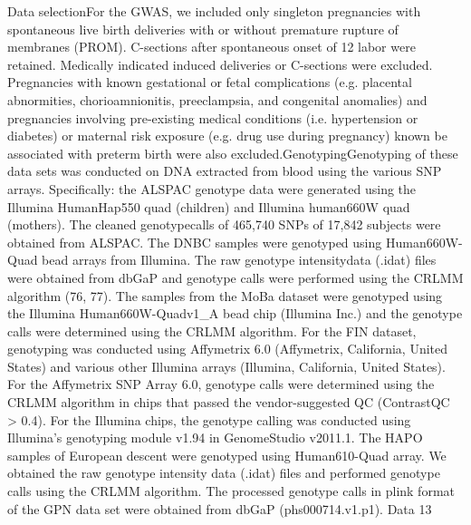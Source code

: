 Data selectionFor the GWAS, we included only singleton pregnancies with spontaneous live birth deliveries with or without premature rupture of membranes (PROM). C-sections after spontaneous onset of 12 labor were retained. Medically indicated induced deliveries or C-sections were excluded. Pregnancies with known gestational or fetal complications (e.g. placental abnormities, chorioamnionitis, preeclampsia, and congenital anomalies) and pregnancies involving pre-existing medical conditions (i.e. hypertension or diabetes) or maternal risk exposure (e.g. drug use during pregnancy) known be associated with preterm birth were also excluded.GenotypingGenotyping of these data sets was conducted on DNA extracted from blood using the various SNP arrays. Specifically: the ALSPAC genotype data were generated using the Illumina HumanHap550 quad (children) and Illumina human660W quad (mothers). The cleaned genotypecalls of 465,740 SNPs of 17,842 subjects were obtained from ALSPAC. The DNBC samples were genotyped using Human660W-Quad bead arrays from Illumina. The raw genotype intensitydata (.idat) files were obtained from dbGaP and genotype calls were performed using the CRLMM algorithm (76, 77). The samples from the MoBa dataset were genotyped using the Illumina Human660W-Quadv1_A bead chip (Illumina Inc.) and the genotype calls were determined using the CRLMM algorithm. For the FIN dataset, genotyping was conducted using Affymetrix 6.0 (Affymetrix, California, United States) and various other Illumina arrays (Illumina, California, United States). For the Affymetrix SNP Array 6.0, genotype calls were determined using the CRLMM algorithm in chips that passed the vendor-suggested QC (ContrastQC > 0.4). For the Illumina chips, the genotype calling was conducted using Illumina’s genotyping module v1.94 in GenomeStudio v2011.1. The HAPO samples of European descent were genotyped using Human610-Quad array. We obtained the raw genotype intensity data (.idat) files and performed genotype calls using the CRLMM algorithm. The processed genotype calls in plink format of the GPN data set were obtained from dbGaP (phs000714.v1.p1). Data 13
